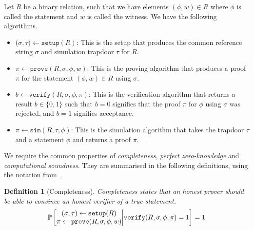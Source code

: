 \documentclass{article}
\newtheorem{definition}{Definition}
\theoremstyle{remark}
\renewcommand{\P}{\mathbb{P}}
\begin{document}
Let $R$ be a binary relation, such that we have elements $(\phi, w) \in R$
where $\phi$ is called the statement and $w$ is called the witness. We have the
following algorithms.

\begin{itemize}
	\item ($\sigma, \tau) \leftarrow \texttt{setup}(R)$: This is the setup that
		produces the common reference string $\sigma$ and simulation trapdoor
		$\tau$ for $R$.

	\item $\pi \leftarrow \texttt{prove}(R, \sigma, \phi, w)$: This is the
		proving algorithm that produces a proof $\pi$ for the statement $(\phi,
		w) \in R$ using $\sigma$.

	\item $b \leftarrow \texttt{verify}(R, \sigma, \phi, \pi)$: This is the
		verification algorithm that returns a result $b \in \{0, 1\}$ such that
		$b = 0$ signifies that the proof $\pi$ for $\phi$ using $\sigma$ was
		rejected, and $b = 1$ signifies acceptance.

	\item $\pi \leftarrow \texttt{sim}(R, \tau, \phi)$: This is the simulation
		algorithm that takes the trapdoor $\tau$ and a statement $\phi$ and
		returns a proof $\pi$.
\end{itemize}

We require the common properties of \textit{completeness}, \textit{perfect
zero-knowledge} and \textit{computational soundness}. They are summarised in
the following definitions, using the notation from~\cite{g16}.

\begin{definition}[Completeness]
	Completeness states that an honest prover should be able to convince an
	honest verifier of a true statement.
	\begin{align*}
		\P\left[
			\begin{matrix}
				(\sigma, \tau) \leftarrow \textup{\texttt{setup}}(R) \\
				\pi \leftarrow \textup{\texttt{prove}}(R, \sigma, \phi, w)
			\end{matrix}
			\middle|
			\textup{\texttt{verify}}(R, \sigma, \phi, \pi) = 1
		\right]
		=
		1
	\end{align*}
\end{definition}
\end{document}
